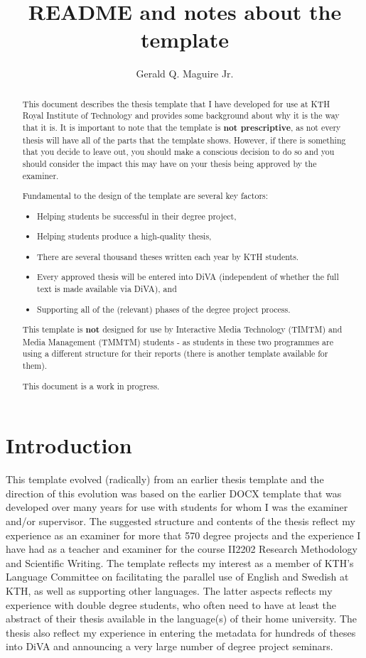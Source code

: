 \documentclass{article}
\title{README and notes about the template}
\author{Gerald Q. Maguire Jr.}
\begin{document}
\maketitle

\begin{abstract}
This document describes the thesis template that I have developed for use at KTH Royal Institute of Technology and provides some background about why it is the way that it is. It is important to note that the template is \textbf{not prescriptive}, as not every thesis will have all of the parts that the template shows. However, if there is something that you decide to leave out, you should make a conscious decision to do so and you should consider the impact this may have on your thesis being approved by the examiner.

Fundamental to the design of the template are several key factors:
\begin{itemize}
    \item Helping students be successful in their degree project,
    \item Helping students produce a high-quality thesis,
    \item There are several thousand theses written each year by KTH students.
    \item Every approved thesis will be entered into DiVA (independent of whether the full text is made available via DiVA), and
    \item Supporting all of the (relevant) phases of the degree project process.
\end{itemize}

This template is \textbf{not} designed for use by Interactive Media Technology (TIMTM) and Media Management (TMMTM) students - as students in these two programmes are using a different structure for their reports (there is another template available for them).

This document is a work in progress.
\end{abstract}

\section{Introduction}
This template evolved (radically) from an earlier thesis template and the direction of this evolution was based on the earlier DOCX template that was developed over many years for use with students for whom I was the examiner and/or supervisor. The suggested structure and contents of the thesis reflect my experience as an examiner for more that 570 degree projects and the experience I have had as a teacher and examiner for the course II2202 Research Methodology and Scientific Writing. The template reflects my interest as a member of KTH's Language Committee on facilitating the parallel use of English and Swedish at KTH, as well as supporting other languages. The latter aspects reflects my experience with double degree students, who often need to have at least the abstract of their thesis available in the language(s) of their home university. The thesis also reflect my experience in entering the metadata for hundreds of theses into DiVA and announcing a very large number of degree project seminars.
\end{document}
